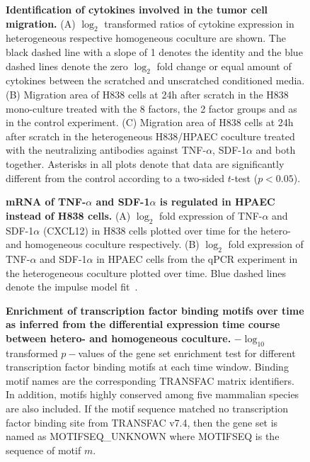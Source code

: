 \begin{figure}[!ht]
\caption{
{\bf Identification of cytokines involved in the tumor cell migration.} 
(A) $\log_2$ transformed ratios of cytokine expression in heterogeneous respective
homogeneous coculture are shown. The black dashed line with a slope of 1 denotes 
the identity and the blue dashed lines denote the zero $\log_2$ fold change
or equal amount of cytokines between the scratched and unscratched conditioned 
media.
(B) Migration area of H838 cells at 24h after scratch in the H838 mono-culture 
treated with the 8
factors, the 2 factor groups and as in the control experiment.
(C) Migration area of H838 cells at 24h after scratch in the heterogeneous 
H838/HPAEC coculture 
treated with the neutralizing antibodies against TNF-$\alpha$, SDF-1$\alpha$
and both together. Asterisks in all plots denote that data are significantly 
different from the control according to a two-sided $t$-test ($p < 0.05$).
}
\label{fig:cytokine}
\end{figure}

\begin{figure}[!ht]
\caption{
{\bf mRNA of TNF-$\alpha$ and SDF-1$\alpha$ is regulated in HPAEC instead of H838 
cells.}
(A) $\log_2$ fold expression of TNF-$\alpha$ and SDF-1$\alpha$ (CXCL12) in H838 
cells plotted
over time for the hetero- and homogeneous coculture respectively.
(B) $\log_2$ fold expression of TNF-$\alpha$ and SDF-1$\alpha$ in HPAEC cells 
from the qPCR
experiment in the heterogeneous coculture plotted
over time. Blue dashed lines denote the impulse model fit~\cite{Chechik2009}.
}
\label{fig:cytokine_dynamic}
\end{figure}

\begin{figure}[!ht]
\caption{
{\bf Enrichment of transcription factor binding motifs over time as inferred
from the differential expression time course between hetero- and homogeneous
coculture.}
$-\log_{10}$ transformed $p-$values of the gene set enrichment test for 
different transcription factor binding motifs at each time window. Binding
motif names are the corresponding TRANSFAC matrix identifiers.
In addition, motifs highly conserved among 
five mammalian species~\cite{Xie2005e} are also included.  If the motif sequence 
matched no transcription factor binding site from TRANSFAC v7.4, then the gene set
is named as MOTIFSEQ\_UNKNOWN where MOTIFSEQ is the sequence of motif $m$.
}
\label{fig:gage}
\end{figure}

